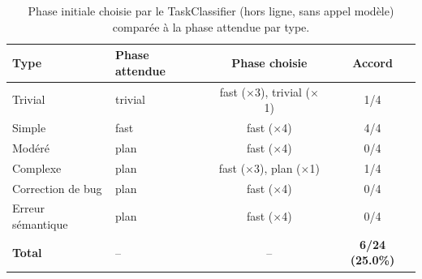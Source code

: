 \begin{table}[htbp]
\centering
\caption{Phase initiale choisie par le TaskClassifier (hors ligne, sans appel modèle) comparée à la phase attendue par type.}
\label{tab:classifier}
\begin{tabular}{llcc}
\toprule
Type & Phase attendue & Phase choisie & Accord \\
\midrule
Trivial & trivial & fast ($\times$3), trivial ($\times$1) & 1/4 \\
Simple & fast & fast ($\times$4) & 4/4 \\
Modéré & plan & fast ($\times$4) & 0/4 \\
Complexe & plan & fast ($\times$3), plan ($\times$1) & 1/4 \\
Correction de bug & plan & fast ($\times$4) & 0/4 \\
Erreur sémantique & plan & fast ($\times$4) & 0/4 \\
\midrule
\textbf{Total} & -- & -- & \textbf{6/24 (25.0\%)} \\
\bottomrule
\end{tabular}
\end{table}
